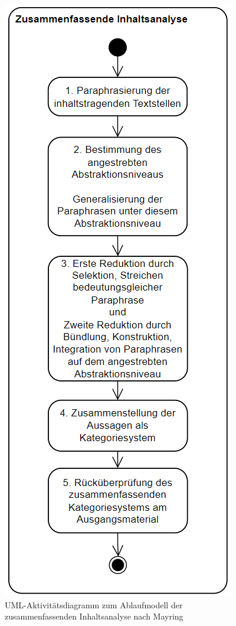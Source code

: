 \begin{figure}[H]
\begin{minipage}[b]{.35\linewidth}
		\label{fig:ablaufmodell}
	\end{minipage}
	\hspace{.1\linewidth}%
	\begin{minipage}[b]{.4\linewidth} %
		\includegraphics[scale=1.2]{Abbildungen/zusammenfassendeInhaltsanalyse.png}
		\caption{UML-Aktivitätsdiagramm zum Ablaufmodell der zusammenfassenden Inhaltsanalyse nach Mayring \cite{mayring2019qualitative}}
		\label{fig:zusammenfassendeinhaltsanalyse}
	\end{minipage}
\end{figure}
